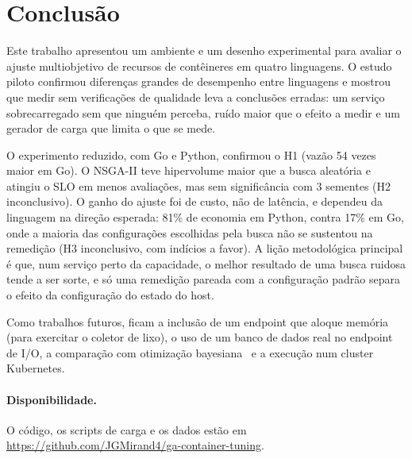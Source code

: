 \documentclass[11pt,a4paper]{article}
\begin{document}
\section{Conclusão}

Este trabalho apresentou um ambiente e um desenho experimental para avaliar o ajuste multiobjetivo de recursos de
contêineres em quatro linguagens. O estudo piloto confirmou diferenças grandes de desempenho entre linguagens e mostrou
que medir sem verificações de qualidade leva a conclusões erradas: um serviço sobrecarregado sem que ninguém perceba,
ruído maior que o efeito a medir e um gerador de carga que limita o que se mede.

O experimento reduzido, com Go e Python, confirmou o H1 (vazão 54 vezes maior em Go). O NSGA-II teve hipervolume maior
que a busca aleatória e atingiu o SLO em menos avaliações, mas sem significância com 3 sementes (H2 inconclusivo). O
ganho do ajuste foi de custo, não de latência, e dependeu da linguagem na direção esperada: 81\% de economia em Python,
contra 17\% em Go, onde a maioria das configurações escolhidas pela busca não se sustentou na remedição (H3 inconclusivo,
com indícios a favor). A lição metodológica principal é que, num serviço perto da capacidade, o melhor resultado de uma
busca ruidosa tende a ser sorte, e só uma remedição pareada com a configuração padrão separa o efeito da configuração do
estado do host.

Como trabalhos futuros, ficam a inclusão de um endpoint que aloque memória (para exercitar o coletor de lixo), o uso de
um banco de dados real no endpoint de I/O, a comparação com otimização bayesiana~\cite{alipourfard2017} e a execução
num cluster Kubernetes.

\paragraph{Disponibilidade.} O código, os scripts de carga e os dados estão em
\url{https://github.com/JGMirand4/ga-container-tuning}.
\end{document}
